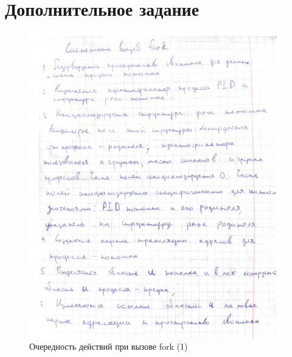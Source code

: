 \documentclass[12pt]{report}
\begin{document}


 

\section*{Дополнительное задание}

\begin{figure}[H]

	\centering

	\includegraphics[width=\linewidth]{img/fork_1.png}
	\caption{Очередность действий при вызове fork (1)}

\end{figure}
\end{document}
